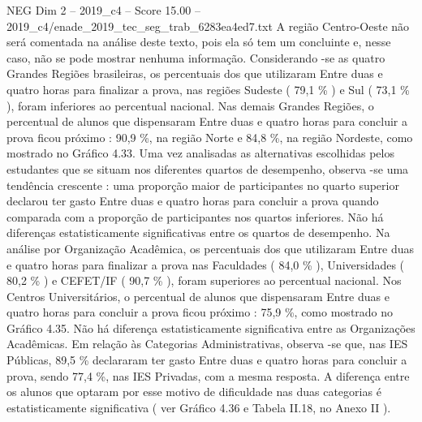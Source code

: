 \begin{textsample}{NEG Dim 2 – 2019\_c4 – Score 15.00 – 2019\_c4/enade\_2019\_tec\_seg\_trab\_6283ea4ed7.txt}
A região Centro-Oeste não será comentada na análise deste texto, pois ela só tem um concluinte e, nesse caso, não se pode mostrar nenhuma informação.
Considerando -se as quatro Grandes Regiões brasileiras, os percentuais dos que utilizaram Entre duas e quatro horas para finalizar a prova, nas regiões Sudeste ( 79,1 \% ) e Sul ( 73,1 \% ), foram inferiores ao percentual nacional.
Nas demais Grandes Regiões, o percentual de alunos que dispensaram Entre duas e quatro horas para concluir a prova ficou próximo : 90,9 \%, na região Norte e 84,8 \%, na região Nordeste, como mostrado no Gráfico 4.33.
Uma vez analisadas as alternativas escolhidas pelos estudantes que se situam nos diferentes quartos de desempenho, observa -se uma tendência crescente : uma proporção maior de participantes no quarto superior declarou ter gasto Entre duas e quatro horas para concluir a prova quando comparada com a proporção de participantes nos quartos inferiores.
Não há diferenças estatisticamente significativas entre os quartos de desempenho.
Na análise por Organização Acadêmica, os percentuais dos que utilizaram Entre duas e quatro horas para finalizar a prova nas Faculdades ( 84,0 \% ), Universidades ( 80,2 \% ) e CEFET/IF ( 90,7 \% ), foram superiores ao percentual nacional.
Nos Centros Universitários, o percentual de alunos que dispensaram Entre duas e quatro horas para concluir a prova ficou próximo : 75,9 \%, como mostrado no Gráfico 4.35.
Não há diferença estatisticamente significativa entre as Organizações Acadêmicas.
Em relação às Categorias Administrativas, observa -se que, nas IES Públicas, 89,5 \% declararam ter gasto Entre duas e quatro horas para concluir a prova, sendo 77,4 \%, nas IES Privadas, com a mesma resposta.
A diferença entre os alunos que optaram por esse motivo de dificuldade nas duas categorias é estatisticamente significativa ( ver Gráfico 4.36 e Tabela II.18, no Anexo II ).

\end{textsample}
